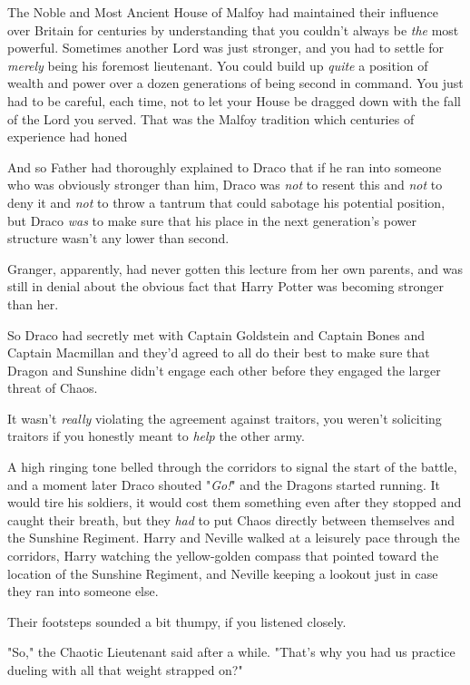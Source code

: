The Noble and Most Ancient House of Malfoy had maintained their influence over
Britain for centuries by understanding that you couldn't always be \emph{the}
most powerful. Sometimes another Lord was just stronger, and you had to settle
for \emph{merely} being his foremost lieutenant. You could build up
\emph{quite} a position of wealth and power over a dozen generations of being
second in command. You just had to be careful, each time, not to let your House
be dragged down with the fall of the Lord you served. That was the Malfoy
tradition which centuries of experience had honed{\el}

And so Father had thoroughly explained to Draco that if he ran into someone who
was obviously stronger than him, Draco was \emph{not} to resent this and
\emph{not} to deny it and \emph{not} to throw a tantrum that could sabotage his
potential position, but Draco \emph{was} to make sure that his place in the
next generation's power structure wasn't any lower than second.

Granger, apparently, had never gotten this lecture from her own parents, and
was still in denial about the obvious fact that Harry Potter was becoming
stronger than her.

So Draco had secretly met with Captain Goldstein and Captain Bones and Captain
Macmillan and they'd agreed to all do their best to make sure that Dragon and
Sunshine didn't engage each other before they engaged the larger threat of
Chaos.

It wasn't \emph{really} violating the agreement against traitors, you weren't
soliciting traitors if you honestly meant to \emph{help} the other army.

A high ringing tone belled through the corridors to signal the start of the
battle, and a moment later Draco shouted "\emph{Go!}" and the Dragons started
running. It would tire his soldiers, it would cost them something even after
they stopped and caught their breath, but they \emph{had} to put Chaos directly
between themselves and the Sunshine Regiment.
\sbreak
Harry and Neville walked at a leisurely pace through the corridors, Harry
watching the yellow-golden compass that pointed toward the location of the
Sunshine Regiment, and Neville keeping a lookout just in case they ran into
someone else.

Their footsteps sounded a bit thumpy, if you listened closely.

"So," the Chaotic Lieutenant said after a while. "That's why you had us
practice dueling with all that weight strapped on?"

